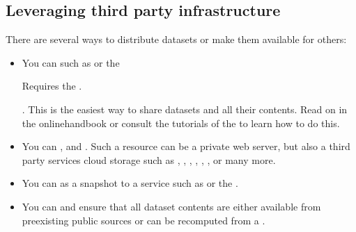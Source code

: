 \subsection{Leveraging third party infrastructure}
\label{\detokenize{basics/101-138-sharethirdparty:leveraging-third-party-infrastructure}}
\sphinxAtStartPar
There are several ways to distribute datasets or make them available for others:
\begin{itemize}
\item {} 
\sphinxAtStartPar
You can  such as {\hyperref[\detokenize{glossary:term-GIN}]{}} or the %
\begin{footnote}\sphinxAtStartFootnote
Requires the .
%
\end{footnote}. This is the easiest way to share datasets and all their contents. Read on in the online\sphinxhyphen{}handbook or consult the tutorials of the  to learn how to do this.

\item {} 
\sphinxAtStartPar
You can , and . Such a resource can be a private web server, but also a third party services cloud storage such as , , , , , , or many more.

\item {} 
\sphinxAtStartPar
You can  as a snapshot to a service such as   or the .

\item {} 
\sphinxAtStartPar
You can  and ensure that
all dataset contents are either available from pre\sphinxhyphen{}existing public sources or can be recomputed from a {\hyperref[\detokenize{glossary:term-run-record}]{}}.

\end{itemize}


